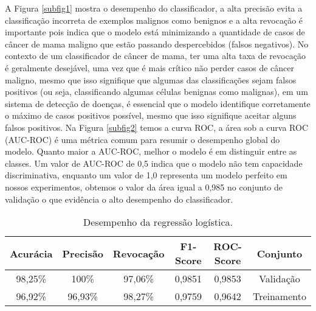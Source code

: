 \documentclass{pssbmac}
\begin{document}
A Figura \ref{subfig1} mostra o desempenho do classificador, a alta precisão evita a classificação incorreta de exemplos malignos como benignos e a alta revocação é importante pois indica que o modelo está minimizando a quantidade de casos de câncer de mama maligno que estão passando despercebidos (falsos negativos). No contexto de um classificador de câncer de mama, ter uma alta taxa de revocação é geralmente desejável, uma vez que é mais crítico não perder casos de câncer maligno, mesmo que isso signifique que algumas das classificações sejam falsos positivos (ou seja, classificando algumas células benignas como malignas), em um sistema de detecção de doenças, é essencial que o modelo identifique corretamente o máximo de casos positivos possível, mesmo que isso signifique aceitar alguns falsos positivos. Na Figura \ref{subfig2} temos a curva ROC, a área sob a curva ROC (AUC-ROC) é uma métrica comum para resumir o desempenho global do modelo. Quanto maior a AUC-ROC, melhor o modelo é em distinguir entre as classes. Um valor de AUC-ROC de 0,5 indica que o modelo não tem capacidade discriminativa, enquanto um valor de 1,0 representa um modelo perfeito em nossos experimentos, obtemos o valor da área igual a 0,985 no conjunto de validação o que evidência o alto desempenho do classificador.

\begin{table}[H]
\caption{ {\small Desempenho da regressão logística.}}
\centering
\begin{tabular}{cccccc}
\hline
Acurácia & Precisão  & Revocação & F1-Score & ROC-Score& Conjunto\\ \hline
98,25\%      & 100\%  & 97,06\%& 0,9851 &  0,9853 & Validação\\
96,92\%      & 96,93\%  & 98,27\%& 0,9759 &  0,9642 & Treinamento\\
\hline
\end{tabular}\label{tabela01}
\end{table}
\end{document}
